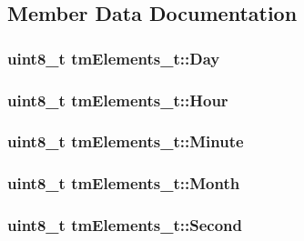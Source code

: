 \subsection{Member Data Documentation}
\hypertarget{structtm_elements__t_aee91d673d261608c983a3c633f9771f2}{
\subsubsection[{Day}]{\setlength{\rightskip}{0pt plus 5cm}uint8\_\-t {\bf tmElements\_\-t::Day}}}
\label{structtm_elements__t_aee91d673d261608c983a3c633f9771f2}
\hypertarget{structtm_elements__t_a4e6dddb4b42b12c7323bff9a2e69164d}{
\subsubsection[{Hour}]{\setlength{\rightskip}{0pt plus 5cm}uint8\_\-t {\bf tmElements\_\-t::Hour}}}
\label{structtm_elements__t_a4e6dddb4b42b12c7323bff9a2e69164d}
\hypertarget{structtm_elements__t_a8796a9859d5cf65f14efac3e2184ff37}{
\subsubsection[{Minute}]{\setlength{\rightskip}{0pt plus 5cm}uint8\_\-t {\bf tmElements\_\-t::Minute}}}
\label{structtm_elements__t_a8796a9859d5cf65f14efac3e2184ff37}
\hypertarget{structtm_elements__t_a8940c4da7431673c28414df19e1e1dcd}{
\subsubsection[{Month}]{\setlength{\rightskip}{0pt plus 5cm}uint8\_\-t {\bf tmElements\_\-t::Month}}}
\label{structtm_elements__t_a8940c4da7431673c28414df19e1e1dcd}
\hypertarget{structtm_elements__t_acd5c5f6eb6954a8df534149ea25f2fb4}{
\subsubsection[{Second}]{\setlength{\rightskip}{0pt plus 5cm}uint8\_\-t {\bf tmElements\_\-t::Second}}}
